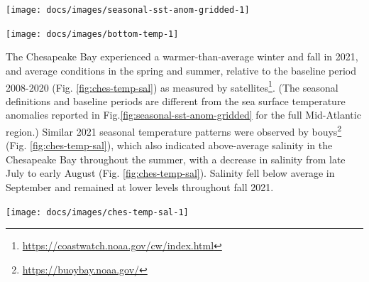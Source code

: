 \documentclass[
  10pt,
]{article}
\let\origfigure\figure
\let\endorigfigure\endfigure
\renewenvironment{figure}[1][2] {
    \expandafter\origfigure\expandafter[H]
} {
    \endorigfigure
}
\begin{document}
\begin{figure}

{\centering \texttt{[image: docs/images/seasonal-sst-anom-gridded-1]} 

}

\caption{MAB seasonal sea surface temperature (SST) time series overlaid onto 2021 seasonal spatial anomalies.}\label{fig:seasonal-sst-anom-gridded}
\end{figure}

\begin{figure}

{\centering \texttt{[image: docs/images/bottom-temp-1]} 

}

\caption{Annual bottom temperature in the Mid-Atlantic Bight. (black = in situ observations, red = observations assimilated by ocean model for comparison)}\label{fig:bottom-temp}
\end{figure}

The Chesapeake Bay experienced a warmer-than-average winter and fall in
2021, and average conditions in the spring and summer, relative to the
baseline period 2008-2020 (Fig. \ref{fig:ches-temp-sal}) as measured by
satellites\footnote{\url{https://coastwatch.noaa.gov/cw/index.html}}.
(The seasonal definitions and baseline periods are different from the
sea surface temperature anomalies reported in
Fig.\ref{fig:seasonal-sst-anom-gridded} for the full Mid-Atlantic
region.) Similar 2021 seasonal temperature patterns were observed by
bouys\footnote{\url{https://buoybay.noaa.gov/}} (Fig.
\ref{fig:ches-temp-sal}), which also indicated above-average salinity in
the Chesapeake Bay throughout the summer, with a decrease in salinity
from late July to early August (Fig. \ref{fig:ches-temp-sal}). Salinity
fell below average in September and remained at lower levels throughout
fall 2021.

\begin{figure}

{\centering \texttt{[image: docs/images/ches-temp-sal-1]} 

}

\caption{Left panel: 2021 sea surface temperature anomalies for the Chesapeake Bay.  Data are from NOAA’s multi-satellite SST products and produced by NOAA’s Coastwatch Program. Seasons are defined to match the annual life cycles of many biological resources in Chesapeake Bay: Dec-Feb for winter, Mar-May for spring, Jun-Aug for summer, and Sep-Nov for fall. Right panel: NOAA Chesapeake Bay Interpretive Buoy System Gooses Reef bouy sea water temperature (top) and salinity (bottom); Red = 2021, Blue = Long term average 2010-2020.}\label{fig:ches-temp-sal}
\end{figure}
\end{document}
